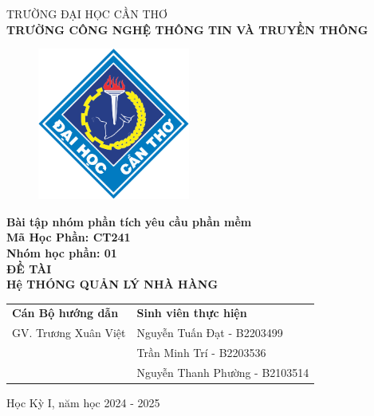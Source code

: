 \begin{titlepage}
  \begin{center}
    \vspace{-6pt}TRƯỜNG ĐẠI HỌC CẦN THƠ \\
    \textbf{\fontsize{16pt}{0pt}\selectfont TRƯỜNG CÔNG NGHỆ THÔNG TIN VÀ TRUYỀN THÔNG}
    \begin{figure}[H]
      \centering
      \includegraphics[width=5cm]{images/logo-ctu.png}
    \end{figure}
    \textbf{Bài tập nhóm phần tích yêu cầu phần mềm} \\
    \textbf{Mã Học Phần: CT241} \\
    \textbf{Nhóm học phần: 01} \\
    \vspace{3.5cm}
    \textbf{\fontsize{16pt}{0pt}\selectfont ĐỀ TÀI} \\
    \textbf{\fontsize{18pt}{0pt}\selectfont Hệ THÓNG QUẢN LÝ NHÀ HÀNG} \\
    \vspace{4.5cm}
    \newcommand{\MyIndent}{\hspace{1cm}}
    \begin{tabular}{p{7cm} l}
      \textbf{Cán Bộ hướng dẫn}         & \textbf{Sinh viên thực hiện}  \\
      \MyIndent GV. Trương Xuân Việt & \MyIndent Nguyễn Tuấn Đạt - B2203499 \\
      \MyIndent& \MyIndent Trần Minh Trí - B2203536 \\
      \MyIndent& \MyIndent Nguyễn Thanh Phường - B2103514
    \end{tabular}


    \vspace{1.5cm}
    \fontsize{14pt}{0pt}\selectfont Học Kỳ I, năm học 2024 - 2025
  \end{center}
\end{titlepage}
\cleardoublepage